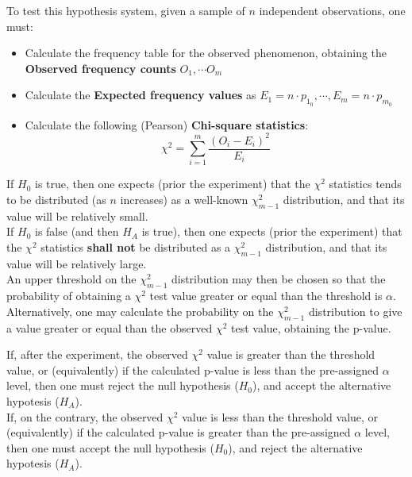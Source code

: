 \begin{frame}
  \vspace{0.25cm}
  To test this hypothesis system, given a sample of $n$ independent observations, one must:
  \begin{itemize}
    \vspace{0.25cm}
    \item Calculate the frequency table for the observed phenomenon, obtaining the \textbf{Observed frequency counts} $O_1, \cdots O_m$
    \vspace{0.35cm}
    \item Calculate the \textbf{Expected frequency values} as $E_1=n \cdot p_{1_0}, \cdots , E_m=n \cdot p_{m_0}$
    \vspace{0.35cm}
    \item Calculate the following (Pearson) \textbf{Chi-square statistics}:  \\
    $$\chi^2=\sum_{i=1}^m\dfrac{(O_i-E_i)^2}{E_i}$$
  \end{itemize}
\end{frame}

\begin{frame}
  \vspace{0.25cm}
  If $H_0$ is true, then one expects (prior the experiment) that the $\chi^2$ statistics tends to be distributed (as $n$ increases) as a well-known $\chi_{m-1}^2$ distribution, and that its value will be relatively small.\\
  \vspace{0.25cm}
  If $H_0$ is false (and then $H_A$ is true), then one expects (prior the experiment) that the $\chi^2$ statistics \textbf{shall not} be distributed as a $\chi_{m-1}^2$ distribution, and that its value will be relatively large.\\
  \vspace{0.25cm}
  An upper threshold on the $\chi_{m-1}^2$ distribution may then be chosen so that the probability of obtaining a $\chi^2$ test value greater or equal than the threshold is $\alpha$.\\
  \vspace{0.25cm}
  Alternatively, one may calculate the probability on the $\chi_{m-1}^2$ distribution to give a value greater or equal than the observed  $\chi^2$ test value, obtaining the  p-value.
\end{frame}

\begin{frame}
  \vspace{0.5cm}
  If, after the experiment, the observed $\chi^2$ value is greater than the threshold value, or (equivalently) if the calculated p-value is less than the pre-assigned $\alpha$ level, then one must reject the null hypothesis ($H_0$), and accept the alternative hypotesis ($H_A$).\\
  \vspace{0.75cm}
  If, on the contrary, the observed $\chi^2$ value is less than the threshold value, or (equivalently) if the calculated p-value is greater than the pre-assigned $\alpha$ level, then one must accept the null hypothesis ($H_0$), and reject the alternative hypotesis ($H_A$).
\end{frame}

